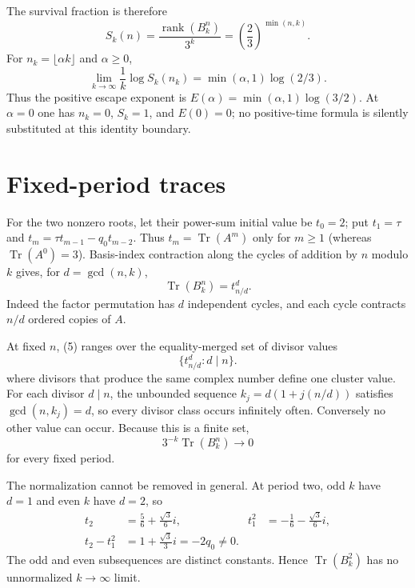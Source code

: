 \documentclass[10pt]{article}
\newcommand{\Tr}{\operatorname{Tr}}
\newcommand{\rank}{\operatorname{rank}}
\begin{document}
The survival fraction is therefore
\begin{equation}
 S_k(n)=\frac{\rank(B_k^n)}{3^k}
       =\left(\frac23\right)^{\min(n,k)}.             \tag{3}
\end{equation}
For $n_k=\lfloor\alpha k\rfloor$ and $\alpha\ge0$,
\begin{equation}
 \lim_{k\to\infty}\frac1k\log S_k(n_k)
 =\min(\alpha,1)\log(2/3).                           \tag{4}
\end{equation}
Thus the positive escape exponent is
$E(\alpha)=\min(\alpha,1)\log(3/2)$.  At $\alpha=0$ one has $n_k=0$,
$S_k=1$, and $E(0)=0$; no positive-time formula is silently substituted at
this identity boundary.

\section{Fixed-period traces}
For the two nonzero roots, let their power-sum initial value be $t_0=2$;
put $t_1=\tau$ and $t_m=\tau t_{m-1}-q_0t_{m-2}$.  Thus
$t_m=\Tr(A^m)$ only for $m\ge1$ (whereas $\Tr(A^0)=3$).  Basis-index
contraction along the cycles of
addition by $n$ modulo $k$ gives, for $d=\gcd(n,k)$,
\begin{equation}
 \Tr(B_k^n)=t_{n/d}^{d}.                             \tag{5}
\end{equation}
Indeed the factor permutation has $d$ independent cycles, and each cycle
contracts $n/d$ ordered copies of $A$.

At fixed $n$, (5) ranges over the equality-merged set of divisor values
\begin{equation}
 \{t_{n/d}^{d}:d\mid n\}.                           \tag{6}
\end{equation}
where divisors that produce the same complex number define one cluster value.
For each divisor $d\mid n$, the unbounded sequence
$k_j=d(1+j(n/d))$ satisfies $\gcd(n,k_j)=d$, so every divisor class occurs
infinitely often.  Conversely no other value can occur.  Because this is a
finite set,
\begin{equation}
 3^{-k}\Tr(B_k^n)\longrightarrow0                    \tag{7}
\end{equation}
for every fixed period.

The normalization cannot be removed in general.  At period two, odd $k$ have
$d=1$ and even $k$ have $d=2$, so
\begin{equation}
\begin{aligned}
t_2&=\frac56+\frac{\sqrt3}{6}i,&
t_1^2&=-\frac16-\frac{\sqrt3}{6}i,\\[-2pt]
t_2-t_1^2&=1+\frac{\sqrt3}{3}i=-2q_0\ne0.
\end{aligned}                                                    \tag{8}
\end{equation}
The odd and even subsequences are distinct constants.  Hence
$\Tr(B_k^2)$ has no unnormalized $k\to\infty$ limit.
\end{document}
